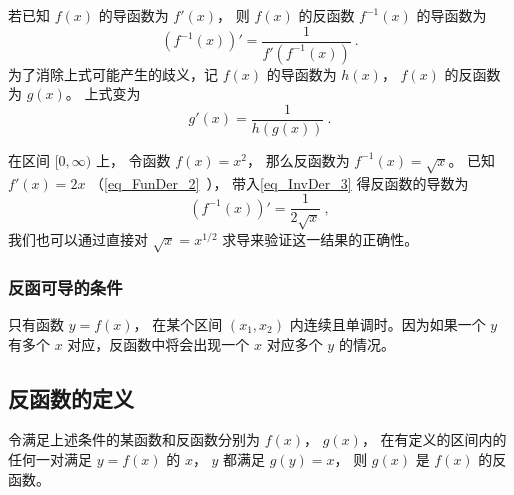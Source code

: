 

若已知 $f(x)$ 的导函数为 $f'(x)$， 则 $f(x)$ 的反函数 $f^{-1}(x)$ 的导函数为
\begin{equation}\label{eq_InvDer_3}
(f^{-1}(x))' = \frac{1}{f'(f^{-1}(x))} ~.
\end{equation} 
为了消除上式可能产生的歧义，记 $f(x)$ 的导函数为 $h(x)$，  $f(x)$ 的反函数为 $g(x)$。 上式变为
 \begin{equation}
g'(x) = \frac{1}{h(g(x))}~.
\end{equation}

\begin{example}{}
在区间 $[0, \infty)$ 上， 令函数 $f(x) = x^2$， 那么反函数为 $f^{-1}(x) = \sqrt{x}$。 已知 $f'(x) = 2x$ （\autoref{eq_FunDer_2}~）， 带入\autoref{eq_InvDer_3} 得反函数的导数为
\begin{equation}
(f^{-1}(x))' = \frac{1}{2\sqrt{x}} ~,
\end{equation}
我们也可以通过直接对 $\sqrt{x} = x^{1/2}$ 求导来验证这一结果的正确性。
\end{example}

\subsubsection{反函可导的条件}
只有函数 $y = f(x)$， 在某个区间 $(x_1, x_2)$ 内连续且单调时。因为如果一个 $y$ 有多个 $x$ 对应，反函数中将会出现一个 $x$ 对应多个 $y$ 的情况。

\subsection{反函数的定义}
令满足上述条件的某函数和反函数分别为 $f(x)$，  $g(x)$， 在有定义的区间内的任何一对满足 $y = f(x)$ 的 $x$，  $y$ 都满足 $g(y) = x$， 则 $g(x)$ 是 $f(x)$ 的反函数。

